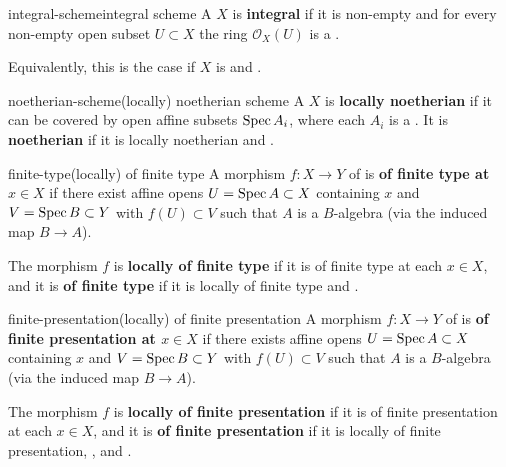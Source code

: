 \begin{topic}{integral-scheme}{integral scheme}
    A  $X$ is \textbf{integral} if it is non-empty and for every non-empty open subset $U \subset X$ the ring $\mathcal{O}_X(U)$ is a .
    
    Equivalently, this is the case if $X$ is  and .
\end{topic}

\begin{topic}{noetherian-scheme}{(locally) noetherian scheme}
    A  $X$ is \textbf{locally noetherian} if it can be covered by open affine subsets $\operatorname{Spec} A_i$, where each $A_i$ is a . It is \textbf{noetherian} if it is locally noetherian and .
\end{topic}

\begin{topic}{finite-type}{(locally) of finite type}
    A morphism $f : X \to Y$ of  is \textbf{of finite type at $x \in X$} if there exist affine opens $U = \operatorname{Spec} A \subset X$ containing $x$ and $V = \operatorname{Spec} B \subset Y$ with $f(U) \subset V$ such that $A$ is a  $B$-algebra (via the induced map $B \to A$).
    
    The morphism $f$ is \textbf{locally of finite type} if it is of finite type at each $x \in X$, and it is \textbf{of finite type} if it is locally of finite type and .
\end{topic}

\begin{topic}{finite-presentation}{(locally) of finite presentation}
    A morphism $f : X \to Y$ of  is \textbf{of finite presentation at $x \in X$} if there exists affine opens $U = \operatorname{Spec} A \subset X$ containing $x$ and $V = \operatorname{Spec} B \subset Y$ with $f(U) \subset V$ such that $A$ is a  $B$-algebra (via the induced map $B \to A$).
    
    The morphism $f$ is \textbf{locally of finite presentation} if it is of finite presentation at each $x \in X$, and it is \textbf{of finite presentation} if it is locally of finite presentation, , and .
\end{topic}

